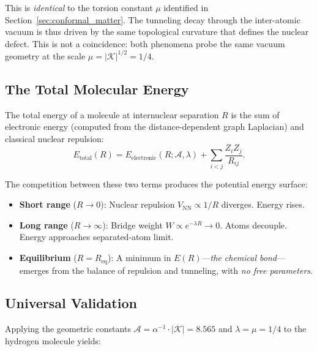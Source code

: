 \documentclass[aps,prd,twocolumn,superscriptaddress,groupedaddress,showpacs]{revtex4-2}
\newcommand{\alphainv}{\ensuremath{\alpha^{-1}}}
\begin{document}
This is \emph{identical} to the torsion constant $\mu$ identified in Section~\ref{sec:conformal_matter}. The tunneling decay through the inter-atomic vacuum is thus driven by the same topological curvature that defines the nuclear defect. This is not a coincidence: both phenomena probe the same vacuum geometry at the scale $\mu = |\mathcal{K}|^{1/2} = 1/4$.

\subsection{The Total Molecular Energy}

The total energy of a molecule at internuclear separation $R$ is the sum of electronic energy (computed from the distance-dependent graph Laplacian) and classical nuclear repulsion:
\begin{equation}
E_{\text{total}}(R) = E_{\text{electronic}}(R; \mathcal{A}, \lambda) + \sum_{i<j} \frac{Z_i Z_j}{R_{ij}}.
\label{eq:molecular_energy}
\end{equation}

The competition between these two terms produces the potential energy surface:
\begin{itemize}
\item \textbf{Short range} ($R \to 0$): Nuclear repulsion $V_{\text{NN}} \propto 1/R$ diverges. Energy rises.
\item \textbf{Long range} ($R \to \infty$): Bridge weight $W \propto e^{-\lambda R} \to 0$. Atoms decouple. Energy approaches separated-atom limit.
\item \textbf{Equilibrium} ($R = R_{\text{eq}}$): A minimum in $E(R)$---\emph{the chemical bond}---emerges from the balance of repulsion and tunneling, with \emph{no free parameters}.
\end{itemize}

\subsection{Universal Validation}
\label{sec:bond_validation}

Applying the geometric constants $\mathcal{A} = \alphainv \cdot |\mathcal{K}| = 8.565$ and $\lambda = \mu = 1/4$ to the hydrogen molecule yields:
\end{document}
